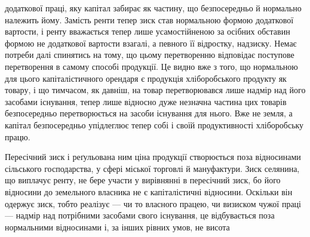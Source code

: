 додаткової праці, яку капітал забирає як частину, що безпосередньо й нормально
належить йому. Замість ренти тепер зиск став нормальною формою додаткової
вартости, і ренту вважається тепер лише усамостійненою за осібних
обставин формою не додаткової вартости взагалі, а певного її відростку, надзиску.
Немає потреби далі спинятись на тому, що цьому перетворенню відповідає
поступове перетворення в самому способі продукції. Це видно вже з того,
що нормальною для цього капіталістичного орендаря є продукція хліборобського
продукту як товару, і що тимчасом, як давніш, на товар перетворювався лише
надмір над його засобами існування, тепер лише відносно дуже незначна частина
цих товарів безпосередньо перетворюється на засоби існування для нього.
Вже не земля, а капітал безпосередньо упідлеглює тепер собі і своїй продуктивності
хліборобську працю.

Пересічний зиск і реґульована ним ціна продукції створюється поза відносинами
сільського господарства, у сфері міської торговлі й мануфактури. Зиск
селянина, що виплачує ренту, не бере участи у вирівнянні в пересічний зиск,
бо його відносини до земельного власника не є капіталістичні відносини.
Оскільки він одержує зиск, тобто реалізує — чи то власного працею, чи визиском
чужої праці — надмір над потрібними засобами свого існування, це відбувається
поза нормальними відносинами і, за інших рівних умов, не висота
\parbreak{}  %
